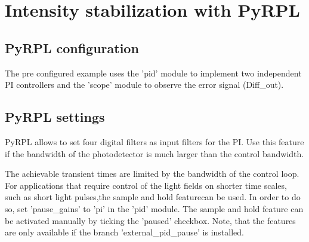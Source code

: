 \documentclass[twoside,a4paper]{refart}
\begin{document}
\section{Intensity stabilization with PyRPL}

\subsection{PyRPL configuration}
The pre configured example uses the 'pid' module to implement two independent PI controllers and the 'scope' module to observe the error signal (Diff\_out).




\subsection{PyRPL settings} \label{sec:pyrpl_settings}

PyRPL allows to set four digital filters as input filters for the PI. Use this feature if the bandwidth of the photodetector is much larger than the control bandwidth.

The achievable transient times are limited by the bandwidth of the control loop. For applications that require control of the light fields on shorter time scales, such as short light pulses,the sample and hold featurecan be used. In order to do so, set 'pause\_gains' to 'pi' in the 'pid' module. The sample and hold feature can be activated manually by ticking the 'paused' checkbox. Note, that the features are only available if the branch 'external\_pid\_pause' is installed.
\end{document}
